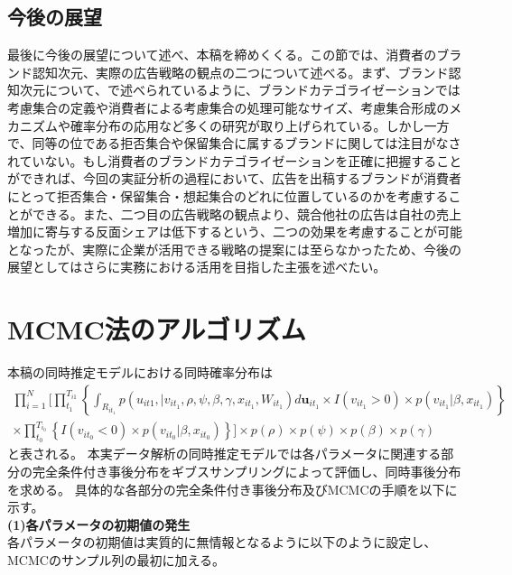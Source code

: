 \documentclass[11pt]{jsarticle}
\begin{document}
\subsection{今後の展望}
\label{sec:suggestion}
最後に今後の展望について述べ、本稿を締めくくる。この節では、消費者のブランド認知次元、実際の広告戦略の観点の二つについて述べる。まず、ブランド認知次元について、\citet{urano2012}で述べられているように、ブランドカテゴライゼーションでは考慮集合の定義や消費者による考慮集合の処理可能なサイズ、考慮集合形成のメカニズムや確率分布の応用など多くの研究が取り上げられている。しかし一方で、同等の位である拒否集合や保留集合に属するブランドに関しては注目がなされていない。もし消費者のブランドカテゴライゼーションを正確に把握することができれば、今回の実証分析の過程において、広告を出稿するブランドが消費者にとって拒否集合・保留集合・想起集合のどれに位置しているのかを考慮することができる。また、二つ目の広告戦略の観点より、競合他社の広告は自社の売上増加に寄与する反面シェアは低下するという、二つの効果を考慮することが可能となったが、実際に企業が活用できる戦略の提案には至らなかったため、今後の展望としてはさらに実務における活用を目指した主張を述べたい。

\nocite{*}

\newpage
\appendix %

\section{MCMC法のアルゴリズム}
本稿の同時推定モデルにおける同時確率分布は
\begin{equation} \label{formula32}
\begin{split}
 \prod_{i=1}^{N}\Biggl[
  \prod_{t_{1}}^{T_{i1}} \left\{
   \int_{R_{it_{1}}} p(u_{it1},|v_{it_{1}},\rho,\psi,\beta,\gamma,x_{it_{1}}, W_{it_{1}})
   d {\boldsymbol u}_{it_{1}} \times I(v_{it_{1}}>0) \times p(v_{it_{1}}|\beta,x_{it_{1}})  
  \right\} \\
  \times \prod_{t_{0}}^{T_{i_{0}}}\left\{
   I(v_{it_{0}}<0)×p(v_{it_{0}}|\beta,x_{it_{0}})
  \right\}
 \Biggr]
 ×p(\rho)×p(\psi)×p(\beta)×p(\gamma)
\end{split}
\end{equation}
と表される。
本実データ解析の同時推定モデルでは各パラメータに関連する部分の完全条件付き事後分布をギブスサンプリングによって評価し、同時事後分布を求める。
具体的な各部分の完全条件付き事後分布及びMCMCの手順を以下に示す。\\[1ex] 

{\bf (1)各パラメータの初期値の発生}\\
各パラメータの初期値は実質的に無情報となるように以下のように設定し、MCMCのサンプル列の最初に加える。
\end{document}
